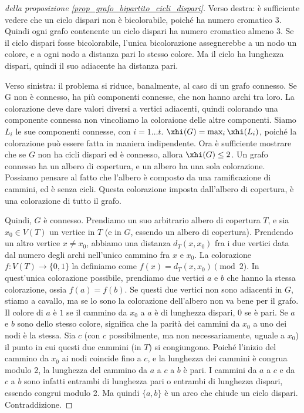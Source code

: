 	\begin{proof}[della proposizione \ref{prop_grafo_bipartito_cicli_dispari}]
		Verso destra: \`e sufficiente vedere che un ciclo dispari non \`e bicolorabile, poich\'e ha numero cromatico 3.
		Quindi ogni grafo contenente un ciclo dispari ha numero cromatico almeno 3.
		Se il ciclo dispari fosse bicolorabile, l'unica bicolorazione assegnerebbe a un nodo un colore, e a ogni nodo a distanza pari lo stesso colore.
		Ma il ciclo ha lunghezza dispari, quindi il suo adiacente ha distanza pari.

		Verso sinistra: il problema si riduce, banalmente, al caso di un grafo connesso.
		Se G non \`e connesso, ha pi\`u componenti connesse, che non hanno archi tra loro.
		La colorazione deve dare valori diversi a vertici adiacenti, quindi colorando una componente connessa non vincoliamo la coloraione delle altre componenti.
		Siamo $L_i$ le sue componenti connesse, con $i = 1 \dots t$.
		$\xhi(G) = \max_{i} \xhi(L_i)$, poich\'e la colorazione pu\`o essere fatta in maniera indipendente.
		Ora \`e sufficiente mostrare che se $G$ non ha cicli dispari ed \`e connesso, allora $\xhi(G) \le 2$.
		Un grafo connesso ha un albero di copertura, e un albero ha una sola colorazione.
		Possiamo pensare al fatto che l'albero \`e composto da una ramificazione di cammini, ed \`e senza cicli.
		Questa colorazione imposta dall'albero di copertura, \`e una colorazione di tutto il grafo.

		Quindi, $G$ \`e connesso.
		Prendiamo un suo arbitrario albero di copertura $T$, e sia $x_0 \in V(T)$ un vertice in $T$ (e in $G$, essendo un albero di copertura).
		Prendendo un altro vertice $x \neq x_0$, abbiamo una distanza $d_T(x,x_0)$ fra i due vertici data dal numero degli archi nell'unico cammino fra $x$ e $x_0$.
		La colorazione $f : V(T) \to \{ 0, 1 \}$ la definiamo come $f(x) = d_T(x, x_0) \pmod{2}$.
		In quest'unica colorazione possibile, prendiamo due vertici $a$ e $b$ che hanno la stessa colorazione, ossia $f(a) = f(b)$.
		Se questi due vertici non sono adiacenti in $G$, stiamo a cavallo, ma se lo sono la colorazione dell'albero non va bene per il grafo.
		Il colore di $a$ \`e $1$ se il cammino da $x_0$ a $a$ \`e di lunghezza dispari, $0$ se \`e pari.
		Se $a$ e $b$ sono dello stesso colore, significa che la parit\`a dei cammini da $x_0$ a uno dei nodi \`e la stessa.
		Sia $c$ (con $c$ possibilmente, ma non necessariamente, uguale a $x_0$) il punto in cui questi due cammini (in $T$) si congiungono.
		Poich\'e l'inizio del cammino da $x_0$ ai nodi coincide fino a $c$, e la lunghezza dei cammini \`e congrua modulo 2, la lunghezza del cammino da $a$ a $c$ a $b$ \`e pari.
		I cammini da $a$ a $c$ e da $c$ a $b$ sono infatti entrambi di lunghezza pari o entrambi di lunghezza dispari, essendo congrui modulo 2.
		Ma quindi $\{a,b\}$ \`e un arco che chiude un ciclo dispari.
		Contraddizione.

	\end{proof}

